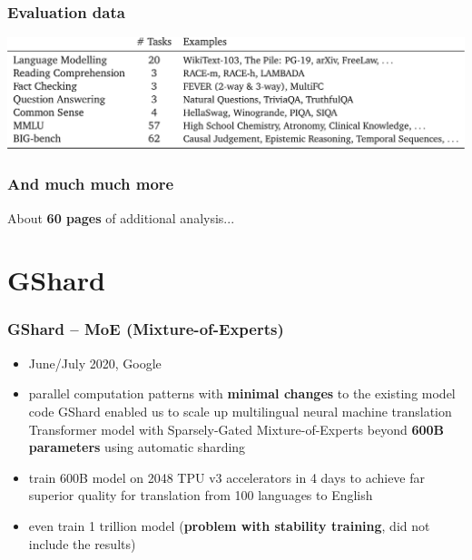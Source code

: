 \documentclass{beamer}
\begin{document}
\begin{frame}
    \frametitle{Evaluation data}
    \begin{center}
        \includegraphics[scale=1.12]{img/gopher_eval_data.png}
    \end{center}
\end{frame}

\begin{frame}
    \frametitle{And much much more}
    About \textbf{60 pages} of additional analysis...
\end{frame}


\section{GShard}
\begin{frame}
    \frametitle{GShard \cite{gshard} -- MoE (Mixture-of-Experts)}
    \begin{itemize}
        \item June/July 2020, Google
        \item parallel computation patterns with \textbf{minimal changes} to the existing model code
GShard enabled us to scale up multilingual neural machine translation Transformer model with Sparsely-Gated Mixture-of-Experts beyond \textbf{600B parameters} using automatic sharding
        \item train 600B model on 2048 TPU v3 accelerators in 4 days to achieve far superior quality for translation from 100 languages to English
        \item even train 1 trillion model (\textbf{problem with stability training}, did not include the results)
    \end{itemize}
\end{frame}
\end{document}

